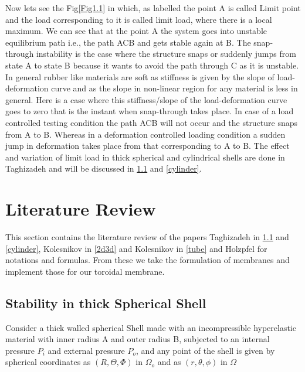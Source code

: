 \documentclass[12pt]{report}
\begin{document}
\newpage

Now lets see the Fig\ref{Fig1.1} in which, as labelled the point A is called Limit point and the load corresponding to it is called limit load, where there is a local maximum. We can see that at the point A  the system goes into unstable equilibrium path i.e., the path ACB and gets stable again at B. The snap-through instability is the case where the structure snaps or suddenly jumps from state A to state B because it wants to avoid the path through C as it is unstable. In general rubber like materials are soft as stiffness is given by the slope of load-deformation curve and as the slope in non-linear region for any material is less in general. Here is a case where this stiffness/slope of the load-deformation curve goes to zero that is the instant when snap-through takes place. In case of a load controlled testing condition the path ACB will not occur and the structure snaps from A to B. Whereas in a deformation controlled loading condition a sudden jump in deformation takes place from that corresponding to A to B. The effect and variation of limit load in thick spherical and cylindrical shells are done in Taghizadeh\cite{snap} and will be discussed in \ref{sphere} and \ref{cylinder}.

\section{Literature Review}
This section contains the literature review of the papers Taghizadeh\cite{snap} in \ref{sphere} and \ref{cylinder}, Kolesnikov\cite{2d3d} in \ref{2d3d} and Kolesnikov\cite{tube} in \ref{tube} and Holzpfel\cite{holzapfel} for notations and formulas. From these we take the formulation of membranes and implement those for our toroidal membrane.

\subsection{Stability in thick Spherical Shell}\label{sphere}
Consider a thick walled spherical Shell made with an incompressible hyperelastic material with inner radius A and outer radius B, subjected to an internal pressure $P_{i}$ and external pressure $P_{o}$, and any point of the shell is given by spherical coordinates as $(R,\Theta,\Phi)$ in $\Omega_{o}$ and as $(r,\theta,\phi)$ in $\Omega$

\vspace{-8mm}
\end{document}
